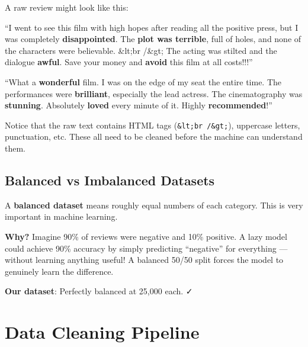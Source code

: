 \documentclass[12pt, a4paper]{article}
\begin{document}
A raw review might look like this:

\begin{tcolorbox}[colback=negative!10, colframe=negative!40, title=\textbf{Raw Negative Review Example}]
\small\ttfamily
``I went to see this film with high hopes after reading all the positive press, but I was completely \textbf{disappointed}. The \textbf{plot was terrible}, full of holes, and none of the characters were believable. \&lt;br /\&gt; The acting was stilted and the dialogue \textbf{awful}. Save your money and \textbf{avoid} this film at all costs!!!''
\end{tcolorbox}

\begin{tcolorbox}[colback=positive!10, colframe=positive!40, title=\textbf{Raw Positive Review Example}]
\small\ttfamily
``What a \textbf{wonderful} film. I was on the edge of my seat the entire time. The performances were \textbf{brilliant}, especially the lead actress. The cinematography was \textbf{stunning}. Absolutely \textbf{loved} every minute of it. Highly \textbf{recommended}!''
\end{tcolorbox}

Notice that the raw text contains HTML tags (\texttt{\&lt;br /\&gt;}), uppercase letters, punctuation, etc. These all need to be cleaned before the machine can understand them.

\subsection{Balanced vs Imbalanced Datasets}

\begin{conceptbox}
A \textbf{balanced dataset} means roughly equal numbers of each category. This is very important in machine learning.

\medskip
\textbf{Why?} Imagine 90\% of reviews were negative and 10\% positive. A lazy model could achieve 90\% accuracy by simply predicting ``negative'' for everything — without learning anything useful! A balanced 50/50 split forces the model to genuinely learn the difference.

\medskip
\textbf{Our dataset}: Perfectly balanced at 25{,}000 each. ✓
\end{conceptbox}

\newpage

\section{Data Cleaning Pipeline}
\end{document}
